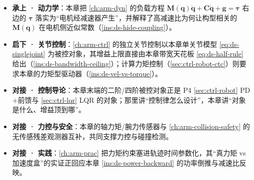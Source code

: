 \begin{itemize}
  \item \textbf{承上 · 动力学}：本章把 \cref{ch:arm-dyn} 的负载方程 $\mathbf{M}(\mathbf{q})\ddot{\mathbf{q}}+\mathbf{C}\dot{\mathbf{q}}+\mathbf{g}=\boldsymbol{\tau}$ 右边的 $\boldsymbol{\tau}$ 落实为“电机经减速器产生”，并解释了高减速比为何让构型相关的 $\mathbf{M}(\mathbf{q})$ 在电机侧近似常数（\cref{ins:ds-hide-coupling}）。
  \item \textbf{启下 · 关节控制}：\cref{ch:arm-ctrl} 的独立关节控制以本章单关节模型 \cref{eq:ds-singlejoint} 为被控对象，其增益上限直接由本章带宽天花板 \cref{eq:ds-half-rule} 给出（\cref{ins:ds-bandwidth-ceiling}）；计算力矩控制（\cref{sec:ctrl-robot-ctc}）则要求本章的力矩型驱动器（\cref{ins:ds-vel-vs-torque}）。
  \item \textbf{对接 · 控制导论}：本章末端的二阶/四阶被控对象正是 P4 \cref{sec:ctrl-robot} PD$+$前馈与 \cref{sec:ctrl-lqr} LQR 的对象；那里讲“控制律怎么设计”，本章讲“对象是什么、增益顶到哪”。
  \item \textbf{对接 · 力控与安全}：本章的轴力矩/腕力传感器与 \cref{ch:arm-collision-safety} 的无传感残差观测器互补，共同支撑力控与碰撞检测。
  \item \textbf{对接 · 实践}：\cref{ch:arm-prac} 把力矩约束塞进轨迹时间参数化，其“真力矩 vs 加速度盒”的实证正回应本章 \cref{ins:ds-power-backward} 的功率倒推与减速比反映。
\end{itemize}
